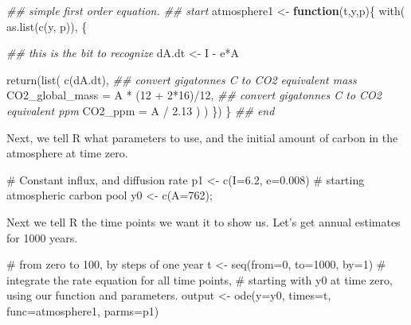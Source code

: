 \documentclass[
  letterpaper,
  DIV=11,
  numbers=noendperiod]{scrreprt}
\newenvironment{Shaded}{\begin{snugshade}}{\end{snugshade}}
\newcommand{\AttributeTok}[1]{\textcolor[rgb]{0.40,0.45,0.13}{#1}}
\newcommand{\CommentTok}[1]{\textcolor[rgb]{0.37,0.37,0.37}{#1}}
\newcommand{\ControlFlowTok}[1]{\textcolor[rgb]{0.00,0.23,0.31}{\textbf{#1}}}
\newcommand{\DecValTok}[1]{\textcolor[rgb]{0.68,0.00,0.00}{#1}}
\newcommand{\DocumentationTok}[1]{\textcolor[rgb]{0.37,0.37,0.37}{\textit{#1}}}
\newcommand{\FloatTok}[1]{\textcolor[rgb]{0.68,0.00,0.00}{#1}}
\newcommand{\FunctionTok}[1]{\textcolor[rgb]{0.28,0.35,0.67}{#1}}
\newcommand{\NormalTok}[1]{\textcolor[rgb]{0.00,0.23,0.31}{#1}}
\newcommand{\OtherTok}[1]{\textcolor[rgb]{0.00,0.23,0.31}{#1}}
\newcommand{\SpecialCharTok}[1]{\textcolor[rgb]{0.37,0.37,0.37}{#1}}
\begin{document}
\begin{Shaded}
\begin{Highlighting}[]
\DocumentationTok{\#\# simple first order equation.}
\DocumentationTok{\#\# start}
\NormalTok{atmosphere1 }\OtherTok{\textless{}{-}} \ControlFlowTok{function}\NormalTok{(t,y,p)\{}
  \FunctionTok{with}\NormalTok{( }\FunctionTok{as.list}\NormalTok{(}\FunctionTok{c}\NormalTok{(y, p)), \{}
    
    \DocumentationTok{\#\# this is the bit to recognize}
\NormalTok{    dA.dt }\OtherTok{\textless{}{-}}\NormalTok{ I }\SpecialCharTok{{-}}\NormalTok{ e}\SpecialCharTok{*}\NormalTok{A}
    
    \FunctionTok{return}\NormalTok{(}\FunctionTok{list}\NormalTok{( }\FunctionTok{c}\NormalTok{(dA.dt), }
                 \DocumentationTok{\#\# convert gigatonnes C to CO2 equivalent mass }
                 \AttributeTok{CO2\_global\_mass =}\NormalTok{ A }\SpecialCharTok{*}\NormalTok{ (}\DecValTok{12} \SpecialCharTok{+} \DecValTok{2}\SpecialCharTok{*}\DecValTok{16}\NormalTok{)}\SpecialCharTok{/}\DecValTok{12}\NormalTok{,}
                 \DocumentationTok{\#\# convert gigatonnes C to CO2 equivalent ppm}
                 \AttributeTok{CO2\_ppm =}\NormalTok{ A }\SpecialCharTok{/} \FloatTok{2.13}
\NormalTok{    ) )}
\NormalTok{  \})}
\NormalTok{\}}
\DocumentationTok{\#\# end}
\end{Highlighting}
\end{Shaded}

Next, we tell R what parameters to use, and the initial amount of carbon
in the atmosphere at time zero.

\begin{Shaded}
\begin{Highlighting}[]
\CommentTok{\# Constant influx, and diffusion rate}
\NormalTok{p1 }\OtherTok{\textless{}{-}} \FunctionTok{c}\NormalTok{(}\AttributeTok{I=}\FloatTok{6.2}\NormalTok{, }\AttributeTok{e=}\FloatTok{0.008}\NormalTok{)}
\CommentTok{\# starting atmospheric carbon pool}
\NormalTok{y0 }\OtherTok{\textless{}{-}} \FunctionTok{c}\NormalTok{(}\AttributeTok{A=}\DecValTok{762}\NormalTok{);}
\end{Highlighting}
\end{Shaded}

Next we tell R the time points we want it to show us. Let's get annual
estimates for 1000 years.

\begin{Shaded}
\begin{Highlighting}[]
\CommentTok{\# from zero to 100, by steps of one year}
\NormalTok{t }\OtherTok{\textless{}{-}} \FunctionTok{seq}\NormalTok{(}\AttributeTok{from=}\DecValTok{0}\NormalTok{, }\AttributeTok{to=}\DecValTok{1000}\NormalTok{, }\AttributeTok{by=}\DecValTok{1}\NormalTok{)}
\CommentTok{\# integrate the rate equation for all time points, }
\CommentTok{\# starting with y0 at time zero, using our function and parameters.}
\NormalTok{output }\OtherTok{\textless{}{-}} \FunctionTok{ode}\NormalTok{(}\AttributeTok{y=}\NormalTok{y0, }\AttributeTok{times=}\NormalTok{t, }\AttributeTok{func=}\NormalTok{atmosphere1, }\AttributeTok{parms=}\NormalTok{p1)}
\end{Highlighting}
\end{Shaded}
\end{document}
